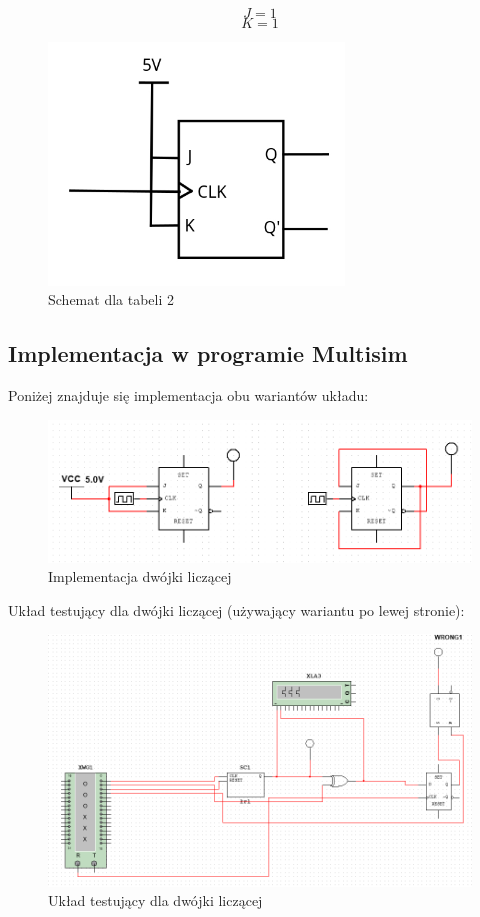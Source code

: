 \documentclass{article}
\begin{document}
$$J=1$$
$$K=1$$

\begin{figure}[H]
    \centering
    \includegraphics[width=0.7\textwidth]{3a_model_2.jpg}
    \caption{Schemat dla tabeli 2}
\end{figure}

\subsection{Implementacja w programie Multisim}
Poniżej znajduje się implementacja obu wariantów układu:

\begin{figure}[H]
    \centering
    \includegraphics[width=\textwidth]{3a_dwojka.png}
    \caption{Implementacja dwójki liczącej}
\end{figure}

Układ testujący dla dwójki liczącej (używający wariantu po lewej stronie):

\begin{figure}[H]
    \centering
    \includegraphics[width=\textwidth]{3a_dwojka_test.png}
    \caption{Układ testujący dla dwójki liczącej}
\end{figure}
\end{document}
